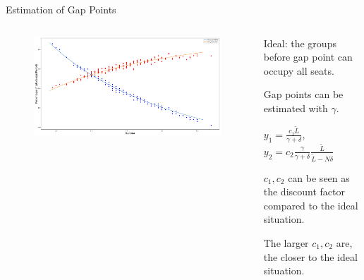     \begin{frame}{Estimation of Gap Points}
      \scriptsize
      \vspace{-0.2cm}

      \begin{columns}
        \begin{column}{0.6\textwidth}
      \begin{figure}[ht]
        \centering
        \includegraphics[width = 1\textwidth]{./images/gamma.pdf}
    \end{figure}
  \end{column}

  \begin{column}{0.4\textwidth}
    Ideal: the groups before gap point can occupy all seats.
    
    Gap points can be estimated with $\gamma$.

    {\color{blue} $y_1 = \frac{c_1 \tilde{L}}{\gamma + \delta}$}, 
    {\color{red}  $y_2 = c_2 \frac{\gamma}{\gamma + \delta} \frac{\tilde{L}}{\tilde{L}-N \delta}$}

    $c_1, c_2$ can be seen as the discount factor compared to the ideal situation.

    The larger $c_1, c_2$ are, the closer to the ideal situation.
  \end{column}
  \end{columns}


\end{frame}
